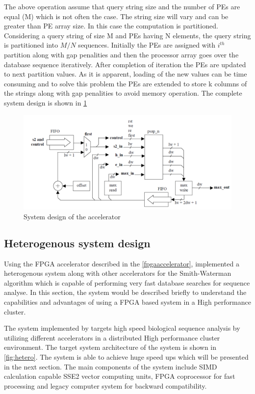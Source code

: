 \documentclass[12pt,twoside]{article}
\begin{document}
The above operation assume that query string size and the number of PEs are equal (M) which is not often the case. The string size will vary and 
can be greater than PE array size. In this case the computation is partitioned. Considering a query string of size M and PEs having N elements,
the query string is partitioned into $ M/N $ sequences. Initially the PEs are assigned with $ i^{th} $ partition along with gap penalities and
then the processor array goes over the database sequence iteratively. After completion of iteration the PEs are updated to next partition values.
As it is apparent, loading of the new values can be time consuming and to solve this problem the PEs are extended to store k columns of the strings along
with gap penalities to avoid memory operation. The complete system design is shown in \cref{fig:systemdesign} 

\begin{figure}%
    \centering
    \includegraphics[width=1.0\textwidth]{fig/systemdesign}
    \caption{System design of the accelerator \cite[Figure 4]{oliver_hyper_2005}}
    \label{fig:systemdesign}
\end{figure}

\subsection{Heterogenous system design}

Using the FPGA accelerator described in the \cref{fpgaaccelerator}, \textcite{meng_high-performance_2010} implemented a heterogenous system
along with other accelerators for the Smith-Waterman algorithm which is capable of performing very fast database searches for sequence analyse.
In this section, the system would be described briefly to understand the capabilities and advantages of using a FPGA based system in a 
High performance cluster.

The system implemented by \textcite{meng_high-performance_2010} targets high speed biological sequence analysis by utilizing different accelerators
in a distributed High performance cluster environment. The target system architecture of the system is shown in \cref{fig:hetero}. The system is able
to achieve huge speed ups which will be presented in the next section. The main components of the system include SIMD calculation capable
SSE2 vector computing units, FPGA coprocessor for fast processing and legacy computer system for backward compatibility.
\end{document}

